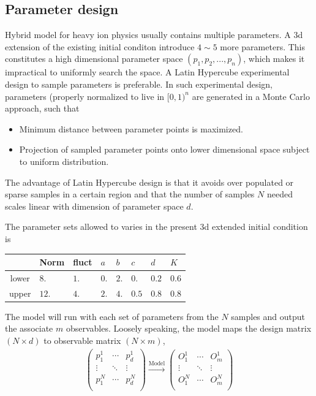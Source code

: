 \documentclass[aps,prl,twocolumn,groupedaddress]{revtex4-1}
\begin{document}
	\subsection{Parameter design}
	Hybrid model for heavy ion physics usually contains multiple parameters. 
	A 3d extension of the existing initial conditon introduce $4\sim5$ more parameters. 
	This constitutes a high dimensional parameter space $(p_1, p_2, ..., p_n)$, which makes it impractical to uniformly search the space. 
	A Latin Hypercube experimental design to sample parameters is preferable. 
	In such experimental design, parameters (properly normalized to live in $[0,1)^n$ are generated in a Monte Carlo approach, such that
	\begin{itemize}
		\item Minimum distance between parameter points is maximized.
		\item Projection of sampled parameter points onto lower dimensional space subject to uniform distribution.
	\end{itemize}
	The advantage of Latin Hypercube design is that it avoids over populated or sparse samples in a certain region and that the number of samples $N$ needed scales linear with dimension of parameter space $d$.
	
	The parameter sets allowed to varies in the present 3d extended initial condition is 
	\begin{center}
	\begin{tabularx}{0.45\textwidth}{c*{7}{Y}}
		\toprule[1pt]
		 & Norm	& fluct	& $a$ & $b$ & $c$ & $d$ & $K$ \\
		\midrule[0.5pt]
		lower & $8.$		&  $1.$	&	$0.$&	 $2.$ & $0.$ & $0.2$ & $0.6$ \\
		upper	& $12.$		&  $4.$	&	$2.$& $4.$ & $0.5$ & $0.8$ & $0.8$ \\
		\bottomrule[1pt]
	\end{tabularx}\label{parameter}
	\end{center}
	The model will run with each set of parameters from the $N$ samples and output the associate $m$ observables. Loosely speaking, the model maps the design matrix $(N \times d)$ to observable matrix $(N \times m)$,
	\begin{eqnarray}\label{design-obs}
	\left(\begin{array}{ccc}
	p_{1}^{1}  & \cdots & p_{d}^{1}\\
	\vdots  & \ddots & \vdots\\
	p_{1}^{N}  & \cdots & p_{d}^{N}\\
	\end{array}\right)
	\xrightarrow{\textrm{Model}} 
	\left(\begin{array}{ccc}
	O_{1}^{1}  & \cdots & O_{m}^{1}\\
	\vdots  & \ddots & \vdots\\
	O_{1}^{N}  & \cdots & O_{m}^{N}\\
	\end{array}\right)
	\end{eqnarray}
	
\end{document}
